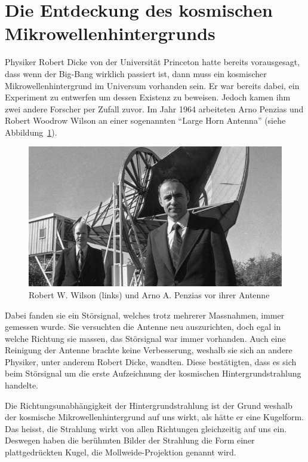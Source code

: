 \section{Die Entdeckung des kosmischen Mikrowellenhintergrunds}
Physiker Robert Dicke von der Universität Princeton hatte bereits vorausgesagt, dass wenn der Big-Bang wirklich passiert ist, dann muss ein kosmischer Mikrowellenhintergrund im Universum vorhanden sein. Er war bereits dabei, ein Experiment zu entwerfen um dessen Existenz zu beweisen. Jedoch kamen ihm zwei andere Forscher per Zufall zuvor.
Im Jahr 1964 arbeiteten Arno Penzias und Robert Woodrow Wilson an einer 
sogenannten ``Large Horn Antenna'' (siehe Abbildung~\ref{fig:wilson_penzias}).
\begin{figure}
	\includegraphics[width=\linewidth]{cmb/images/penzias-wilson-large-horn-antenna.jpg}
	\caption{Robert W. Wilson (links) und Arno A. Penzias vor ihrer Antenne}
	\label{fig:wilson_penzias}
\end{figure}
Dabei fanden sie ein Störsignal, welches trotz mehrerer Massnahmen, immer gemessen wurde.
Sie versuchten die Antenne neu auszurichten, doch egal in welche Richtung sie massen,
das Störsignal war immer vorhanden.
Auch eine Reinigung der Antenne brachte keine Verbesserung, weshalb sie sich an 
andere Physiker, unter anderem Robert Dicke, wandten. Diese bestätigten, dass 
es sich beim Störsignal um die erste Aufzeichnung der kosmischen 
Hintergrundstrahlung handelte.

Die Richtungsunabhängigkeit der Hintergrundstrahlung ist der Grund weshalb der 
kosmische Mikrowellenhintergrund auf uns wirkt, als hätte er eine Kugelform. 
Das heisst, die Strahlung wirkt von allen Richtungen gleichzeitig auf uns ein.
Deswegen haben die berühmten Bilder der Strahlung die Form einer 
plattgedrückten Kugel, die Mollweide-Projektion genannt wird.

